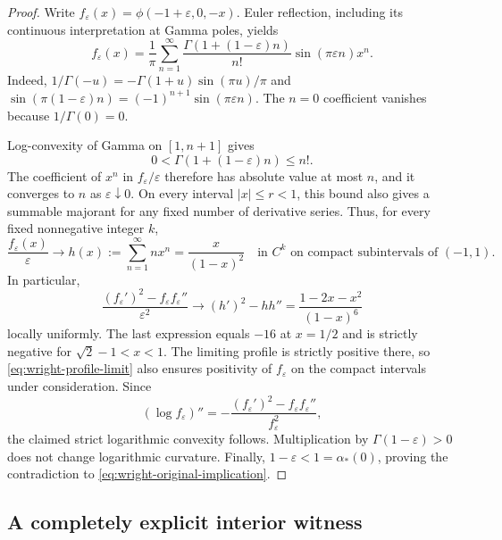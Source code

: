 \documentclass[11pt,a4paper]{article}
\theoremstyle{definition}
\theoremstyle{remark}
\numberwithin{equation}{section}
\begin{document}
\begin{proof}
Write $f_\varepsilon(x)=\phi(-1+\varepsilon,0,-x)$. Euler reflection,
including its continuous interpretation at Gamma poles, yields
\begin{equation}
 f_\varepsilon(x)
 =\frac1\pi\sum_{n=1}^{\infty}
   \frac{\Gamma(1+(1-\varepsilon)n)}{n!}
   \sin(\pi\varepsilon n)x^n.
 \label{eq:wright-reflected-series}
\end{equation}
Indeed,
$1/\Gamma(-u)=-\Gamma(1+u)\sin(\pi u)/\pi$ and
$\sin(\pi(1-\varepsilon)n)=(-1)^{n+1}\sin(\pi\varepsilon n)$.
The $n=0$ coefficient vanishes because $1/\Gamma(0)=0$.

Log-convexity of Gamma on $[1,n+1]$ gives
\[
 0<\Gamma(1+(1-\varepsilon)n)\leq n!.
\]
The coefficient of $x^n$ in $f_\varepsilon/\varepsilon$ therefore has
absolute value at most $n$, and it converges to $n$ as
$\varepsilon\downarrow0$. On every interval $|x|\leq r<1$, this bound
also gives a summable majorant for any fixed number of derivative
series. Thus, for every fixed nonnegative integer $k$,
\begin{equation}
 \frac{f_\varepsilon(x)}{\varepsilon}
 \longrightarrow h(x):=\sum_{n=1}^{\infty}nx^n
 =\frac{x}{(1-x)^2}
 \quad\text{in }C^k\text{ on compact subintervals of }(-1,1).
 \label{eq:wright-profile-limit}
\end{equation}
In particular,
\begin{equation}
 \frac{(f_\varepsilon')^2-f_\varepsilon f_\varepsilon''}
      {\varepsilon^2}
 \longrightarrow
 (h')^2-hh''
 =\frac{1-2x-x^2}{(1-x)^6}
 \label{eq:wright-profile-curvature}
\end{equation}
locally uniformly. The last expression equals $-16$ at $x=1/2$ and
is strictly negative for $\sqrt2-1<x<1$. The limiting profile is
strictly positive there, so \eqref{eq:wright-profile-limit} also
ensures positivity of $f_\varepsilon$ on the compact intervals under
consideration. Since
\[
 (\log f_\varepsilon)''
 =-\frac{(f_\varepsilon')^2-f_\varepsilon f_\varepsilon''}
          {f_\varepsilon^2},
\]
the claimed strict logarithmic convexity follows. Multiplication by
$\Gamma(1-\varepsilon)>0$ does not change logarithmic curvature.
Finally, $1-\varepsilon<1=\alpha_*(0)$, proving the contradiction to
\eqref{eq:wright-original-implication}.
\end{proof}

\subsection{A completely explicit interior witness}
\end{document}

